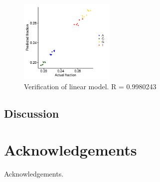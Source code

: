 \documentclass[parskip=full, numbers=noenddot]{scrreprt}
\begin{document}
\begin{figure}[h]
  \centering
  \includegraphics[width=0.4\textwidth]{linearmodel_plot}
  \caption{Verification of linear model. R = 0.9980243}
  \label{fig:linearmodel_ver}
\end{figure}

\section{Discussion}
\label{sec:pcrbias_discussion}




\chapter{Acknowledgements}
\label{ch:ack}

Acknowledgements.

\printbibliography
\end{document}
